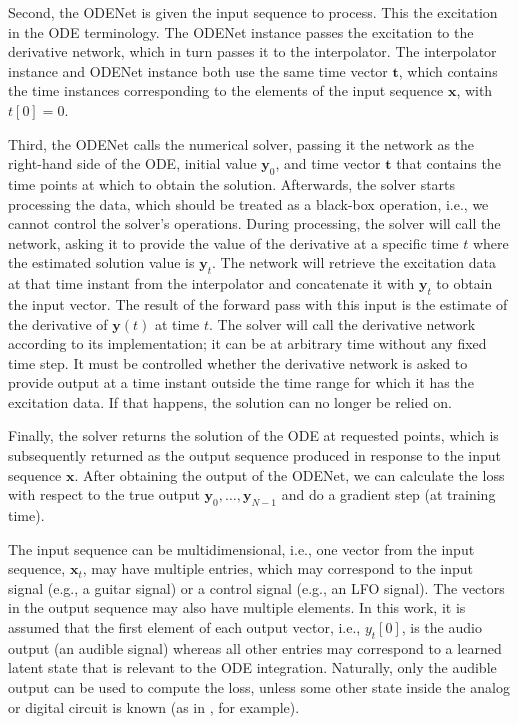 Second, the ODENet is given the input sequence to process. This the excitation in the \ac{ODE} terminology. The ODENet instance passes the excitation to the derivative network, which in turn passes it to the interpolator. The interpolator instance and ODENet instance both use the same time vector $\pmb{t}$, which contains the time instances corresponding to the elements of the input sequence $\pmb{x}$, with $t[0]=0$. 

Third, the ODENet calls the numerical solver, passing it the network as the right-hand side of the \ac{ODE}, initial value $\pmb{y}_0$, and time vector $\pmb{t}$ that contains the time points at which to obtain the solution. Afterwards, the solver starts processing the data, which should be treated as a black-box operation, i.e., we cannot control the solver's operations. During processing, the solver will call the network, asking it to provide the value of the derivative at a specific time $t$ where the estimated solution value is $\pmb{y}_t$. The network will retrieve the excitation data at that time instant from the interpolator and concatenate it with $\pmb{y}_t$ to obtain the input vector. The result of the forward pass with this input is the estimate of the derivative of $\pmb{y}(t)$ at time $t$. The solver will call the derivative network according to its implementation; it can be at arbitrary time without any fixed time step. It must be controlled whether the derivative network is asked to provide output at a time instant outside the time range for which it has the excitation data. If that happens, the solution can no longer be relied on. 

Finally, the solver returns the solution of the \ac{ODE} at requested points, which is subsequently returned as the output sequence produced in response to the input sequence $\pmb{x}$. After obtaining the output of the ODENet, we can calculate the loss with respect to the true output $\pmb{y}_0, \dots, \pmb{y}_{N-1}$ and do a gradient step (at training time).

The input sequence can be multidimensional, i.e., one vector from the input sequence, $\pmb{x}_t$, may have multiple entries, which may correspond to the input signal (e.g., a guitar signal) or a control signal (e.g., an \ac{LFO} signal). The vectors in the output sequence may also have multiple elements. In this work, it is assumed that the first element of each output vector, i.e., $y_t[0]$, is the audio output (an audible signal) whereas all other entries may correspond to a learned latent state that is relevant to the \ac{ODE} integration. Naturally, only the audible output can be used to compute the loss, unless some other state inside the analog or digital circuit is known (as in \cite{Parker2019}, for example).

